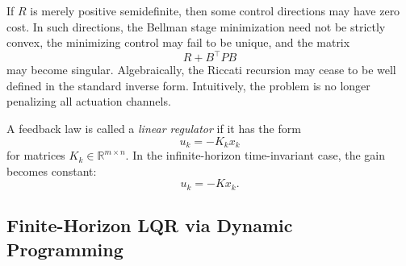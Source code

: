 \begin{remark}
	If $R$ is merely positive semidefinite, then some control directions may have zero cost. In such directions, the Bellman stage minimization need not be strictly convex, the minimizing control may fail to be unique, and the matrix
	\[
		R+B^\top P B
	\]
	may become singular. Algebraically, the Riccati recursion may cease to be well defined in the standard inverse form. Intuitively, the problem is no longer penalizing all actuation channels.
\end{remark}

\begin{definition}\label{def:l6-linear-regulator-structure}
	A feedback law is called a \emph{linear regulator} if it has the form
	\[
		u_k = -K_k x_k
	\]
	for matrices $K_k \in \mathbb{R}^{m \times n}$. In the infinite-horizon time-invariant case, the gain becomes constant:
	\[
		u_k = -Kx_k.
	\]
\end{definition}

\subsection{Finite-Horizon LQR via Dynamic Programming}
\label{sec:l6-finite-horizon-lqr-via-dynamic-programming}

